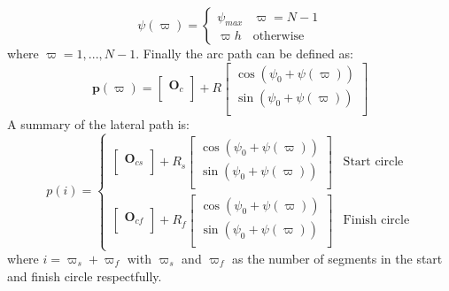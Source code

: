 \begin{equation}
\psi(\varpi) = \begin{cases}
\psi_{max} & \varpi = N-1 \\
\varpi h & \text{otherwise}
\end{cases}
\end{equation}
where $\varpi = 1,...,N-1$. Finally the arc path can be defined as:
\begin{equation}
\mathbf{p}(\varpi) = \begin{bmatrix}
\mathbf{O}_c \\
\end{bmatrix} + R\begin{bmatrix}
\cos(\psi_0 + \psi(\varpi)) \\
\sin(\psi_0 + \psi(\varpi)) \\
\end{bmatrix}
\end{equation}
A summary of the lateral path is:
\begin{equation}
p(i) = \begin{cases}
\begin{bmatrix}
\mathbf{O}_{cs} \\
\end{bmatrix} + R_s\begin{bmatrix}
\cos(\psi_{0} + \psi(\varpi)) \\
\sin(\psi_{0} + \psi(\varpi)) \\
\end{bmatrix} & \text{Start circle} \\
\begin{bmatrix}
\mathbf{O}_{cf} \\
\end{bmatrix} + R_f\begin{bmatrix}
\cos(\psi_{0} + \psi(\varpi)) \\
\sin(\psi_{0} + \psi(\varpi)) \\
\end{bmatrix} & \text{Finish circle}
\end{cases}
\end{equation}
where $i = \varpi_s + \varpi_f$ with $\varpi_s$ and $\varpi_f$ as the number of segments in the start and finish circle respectfully.
